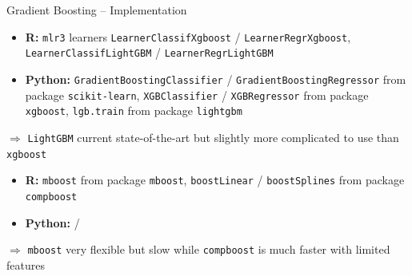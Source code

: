 \begin{frame}{Gradient Boosting -- Implementation}

\begin{itemize}
  \item \textbf{R:} \texttt{mlr3} learners \texttt{LearnerClassifXgboost} / 
  \texttt{LearnerRegrXgboost}, \texttt{LearnerClassifLightGBM} / 
  \texttt{LearnerRegrLightGBM}
  \item \textbf{Python:} \texttt{GradientBoostingClassifier} / 
  \texttt{GradientBoostingRegressor} from package \texttt{scikit-learn}, 
  \texttt{XGBClassifier} / \texttt{XGBRegressor} from package \texttt{xgboost},
  \texttt{lgb.train} from package \texttt{lightgbm}
\end{itemize}

$\Rightarrow$ \texttt{LightGBM} current state-of-the-art but slightly more complicated to use than \texttt{xgboost} 

\medskip

\begin{itemize}
    \item \textbf{R:} \texttt{mboost} from package \texttt{mboost}, 
    \texttt{boostLinear} / \texttt{boostSplines} from package \texttt{compboost}
   \item \textbf{Python:} /
\end{itemize}

$\Rightarrow$ \texttt{mboost} very flexible but slow while \texttt{compboost} is much faster with limited features

\end{frame}



